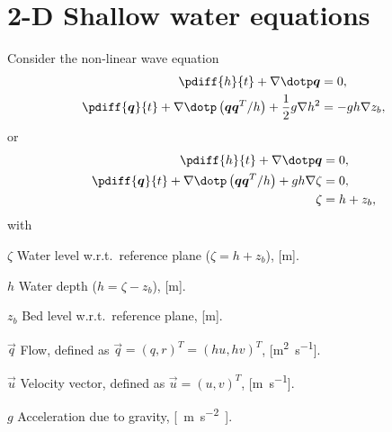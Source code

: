\chapter{2-D Shallow water equations}
Consider the non-linear wave equation
\begin{subequations}
    \begin{align}
        \pdiff{h}{t} + \nabla \dotp \vec{q} & = 0,
        \\
        \pdiff{\vec{q}}{t} +  \nabla \dotp \left( \vec{q}\vec{q}^T/h\right) + \half g \nabla h^2 & = -gh\nabla z_b,
    \end{align}
\end{subequations}
or
\begin{subequations}
    \begin{align}
    \pdiff{h}{t} + \nabla \dotp \vec{q} & = 0,
    \\
    \pdiff{\vec{q}}{t} +  \nabla \dotp \left( \vec{q}\vec{q}^T/h\right) + gh \nabla \zeta & = 0,
    \\
    \zeta & = h + z_b,
\end{align}
\end{subequations}
with
\begin{symbollist}
    \item[$\zeta$] Water level  w.r.t.\ reference plane ($\zeta = h + z_b$), [\si{\metre}].
    \item[$h$] Water depth ($h = \zeta - z_b$), [\si{\metre}].
    \item[$z_b$] Bed level  w.r.t.\ reference plane, [\si{\metre}].
    \item[$\vec{q}$] Flow, defined as $\vec{q} = (q, r)^T = (hu, hv)^T$, [\si{\square\metre\per\second}].
    \item[$\vec{u}$] Velocity vector, defined as $\vec{u} = (u, v)^T$, [\si{\metre\per\second}].
    \item[$g$] Acceleration due to gravity, \si{[\metre\per\square\second]}.
\end{symbollist}
